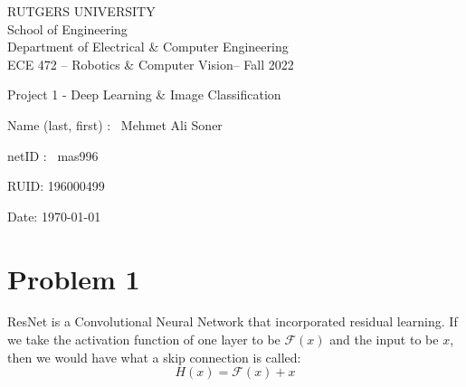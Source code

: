\documentclass{article}
\numberwithin{equation}{section}
\numberwithin{equation}{section}
\def\ce{\begin{center}}
\def\cend{\end{center}}
\def\red{\color{red}}
\def\blue{\color{blue}}
\begin{document}
\ce
\red\Large
RUTGERS UNIVERSITY \\[0.05in]
School of Engineering \\[0.05in]
Department of Electrical \& Computer Engineering \\[0.2in]
\blue ECE 472 -- Robotics \& Computer Vision-- Fall 2022
\cend

\vspace{1in}

\huge \blue 

\begin{center}
Project 1 - Deep Learning \& Image Classification
\end{center}

\vspace{1in}

\Large

Name (last, first) : \ Mehmet Ali Soner 

\vspace{0.3in}

netID : \ mas996

\vspace{0.3in}

RUID:  196000499

\vspace{0.3in}

Date: \today




\vspace{1in}

\color{black} \normalsize


\newpage




\section{Problem 1}
ResNet is a Convolutional Neural Network that incorporated residual learning. If we take the activation function of one layer to be $ \mathcal{F}(x)$ and the input to be $x$, then we would have what a skip connection is called:
$$
H(x) = \mathcal{F}(x) + x
$$ 
\end{document}

